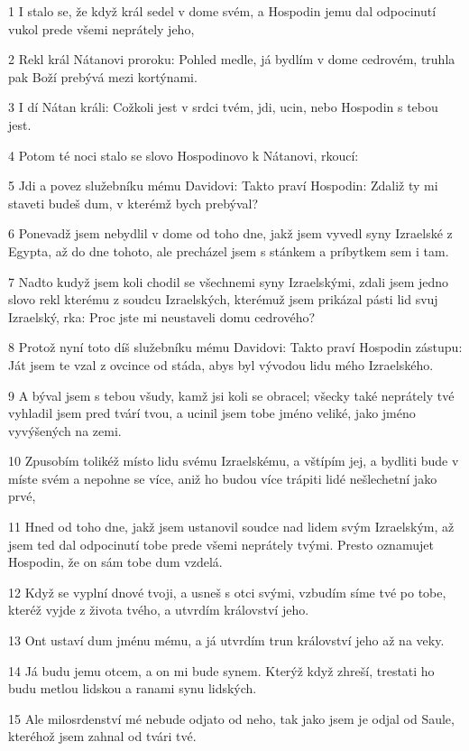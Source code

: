 \par 1 I stalo se, že když král sedel v dome svém, a Hospodin jemu dal odpocinutí vukol prede všemi neprátely jeho,
\par 2 Rekl král Nátanovi proroku: Pohled medle, já bydlím v dome cedrovém, truhla pak Boží prebývá mezi kortýnami.
\par 3 I dí Nátan králi: Cožkoli jest v srdci tvém, jdi, ucin, nebo Hospodin s tebou jest.
\par 4 Potom té noci stalo se slovo Hospodinovo k Nátanovi, rkoucí:
\par 5 Jdi a povez služebníku mému Davidovi: Takto praví Hospodin: Zdaliž ty mi staveti budeš dum, v kterémž bych prebýval?
\par 6 Ponevadž jsem nebydlil v dome od toho dne, jakž jsem vyvedl syny Izraelské z Egypta, až do dne tohoto, ale precházel jsem s stánkem a príbytkem sem i tam.
\par 7 Nadto kudyž jsem koli chodil se všechnemi syny Izraelskými, zdali jsem jedno slovo rekl kterému z soudcu Izraelských, kterémuž jsem prikázal pásti lid svuj Izraelský, rka: Proc jste mi neustaveli domu cedrového?
\par 8 Protož nyní toto díš služebníku mému Davidovi: Takto praví Hospodin zástupu: Ját jsem te vzal z ovcince od stáda, abys byl vývodou lidu mého Izraelského.
\par 9 A býval jsem s tebou všudy, kamž jsi koli se obracel; všecky také neprátely tvé vyhladil jsem pred tvárí tvou, a ucinil jsem tobe jméno veliké, jako jméno vyvýšených na zemi.
\par 10 Zpusobím tolikéž místo lidu svému Izraelskému, a vštípím jej, a bydliti bude v míste svém a nepohne se více, aniž ho budou více trápiti lidé nešlechetní jako prvé,
\par 11 Hned od toho dne, jakž jsem ustanovil soudce nad lidem svým Izraelským, až jsem ted dal odpocinutí tobe prede všemi neprátely tvými. Presto oznamujet Hospodin, že on sám tobe dum vzdelá.
\par 12 Když se vyplní dnové tvoji, a usneš s otci svými, vzbudím síme tvé po tobe, kteréž vyjde z života tvého, a utvrdím království jeho.
\par 13 Ont ustaví dum jménu mému, a já utvrdím trun království jeho až na veky.
\par 14 Já budu jemu otcem, a on mi bude synem. Kterýž když zhreší, trestati ho budu metlou lidskou a ranami synu lidských.
\par 15 Ale milosrdenství mé nebude odjato od neho, tak jako jsem je odjal od Saule, kteréhož jsem zahnal od tvári tvé.
